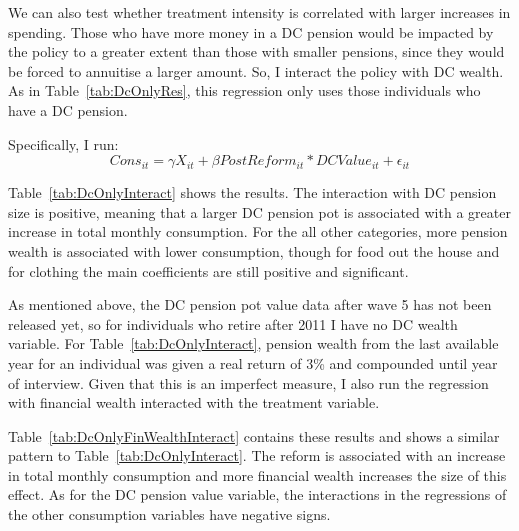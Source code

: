 \documentclass[12pt]{article}
\begin{document}
We can also test whether treatment intensity is correlated with larger increases
in spending. Those who have more money in a DC pension would be impacted by the
policy to a greater extent than those with smaller pensions, since they would be
forced to annuitise a larger amount. So, I interact the policy with DC wealth.
As in Table~\ref{tab:DcOnlyRes}, this regression only uses those individuals who
have a DC pension.

Specifically, I run:
\begin{equation*}
  Cons_{it} =  \gamma X_{it} + \beta PostReform_{it}*DCValue_{it} + \epsilon_{it}
\end{equation*}

Table~\ref{tab:DcOnlyInteract} shows the results. The interaction with DC
pension size is positive, meaning that a larger DC pension pot is associated with a
greater increase in total monthly consumption. For the all other categories,
more pension wealth is associated with lower consumption, though for food out
the house and for clothing the main coefficients are still positive and
significant.

As mentioned above, the DC pension pot value data after
wave 5 has not been released yet, so for individuals who retire after 2011 I
have no DC wealth variable. For Table~\ref{tab:DcOnlyInteract}, pension wealth
from the last available year for an individual was given a real return of 3\%
and compounded until year of interview. Given that this is an imperfect measure,
I also run the regression with financial wealth interacted with the treatment
variable.

Table~\ref{tab:DcOnlyFinWealthInteract} contains these results and shows a
similar pattern to Table~\ref{tab:DcOnlyInteract}. The reform is associated with
an increase in total monthly consumption and more financial wealth increases the
size of this effect. As for the DC pension value variable, the interactions
in the regressions of the other consumption variables have negative signs.

\begin{landscape}
  \linespread{1}
  
\end{landscape}

\begin{landscape}
  \linespread{1}
  
\end{landscape}
\begin{landscape}
  \linespread{1}
  
\end{landscape}
\end{document}
